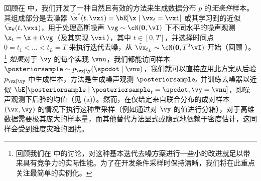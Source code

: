 \documentclass[../../book-main_zh.tex]{subfiles}
\begin{document}
回顾在  中，我们开发了一种自然且有效的方法来生成数据分布 $p$ 的\textit{无条件}样本。其组成部分是去噪器 $\bar{\x}^\ast(t, \vxi) = \bE[ \x \mid \vx_t=\vxi ]$ 或其学习到的近似 $\bar{\x}_{\theta}(t, \vxi)$，用于处理高斯噪声 $\vg \sim \cN(\mathbf{0}, \vI)$ 下不同水平的噪声观测 $\x_t = \x + t \vg$（及其实现 $\vxi$），其中 $t \in [0, T]$，并选择时间点 $0 = t_1 < \dots < t_{L} = T$ 来执行迭代去噪，从 $\hat{\vx}_{t_L} \sim \cN(\mathbf{0}, T^2 \vI)$ 开始（回顾 ）。\footnote{回顾我们在  中的讨论，对这种基本迭代去噪方案进行一些小的改进就足以带来具有竞争力的实际性能。为了在开发条件采样时保持清晰，我们将在此重点关注最简单的实例化。}
\textit{如果}对于 $\vy$ 的每个实现 $\vnu$，我们都能访问样本 $\posteriorsample \sim p_{\vx \mid \y}(\spcdot \mid \vnu)$，我们就可以直接应用此方案从后验 $p_{\vx \mid \vy}$ 中生成样本，方法是生成噪声观测 $\posteriorsample_t$ 并训练去噪器以近似 $\bE[ \posteriorsample \mid \posteriorsample_t=\spcdot, \vy=\vnu ]$，即噪声观测下后验的均值（见 (a)）。然而，在仅给定来自联合分布的成对样本 $(\vx, \vy)$ 的情况下执行这种重采样（例如通过对 $\vy$ 的值进行分箱），对于高维数据需要极其庞大的样本量，而其他替代方法显式或隐式地依赖于密度估计，这同样会受到维度灾难的困扰。
\end{document}
